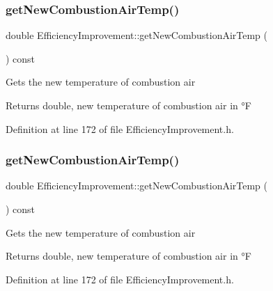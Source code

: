 \subsubsection{\texorpdfstring{get\+New\+Combustion\+Air\+Temp()}{getNewCombustionAirTemp()}\hspace{0.1cm}{\footnotesize\ttfamily [1/3]}}
{\footnotesize\ttfamily double Efficiency\+Improvement\+::get\+New\+Combustion\+Air\+Temp (\begin{DoxyParamCaption}{ }\end{DoxyParamCaption}) const\hspace{0.3cm}{\ttfamily [inline]}}

Gets the new temperature of combustion air

\begin{DoxyReturn}{Returns}
double, new temperature of combustion air in °F 
\end{DoxyReturn}


Definition at line 172 of file Efficiency\+Improvement.\+h.

\mbox{\label{class_efficiency_improvement_a6a699fe87fec378962c2ee1505600dce}} 
\subsubsection{\texorpdfstring{get\+New\+Combustion\+Air\+Temp()}{getNewCombustionAirTemp()}\hspace{0.1cm}{\footnotesize\ttfamily [2/3]}}
{\footnotesize\ttfamily double Efficiency\+Improvement\+::get\+New\+Combustion\+Air\+Temp (\begin{DoxyParamCaption}{ }\end{DoxyParamCaption}) const\hspace{0.3cm}{\ttfamily [inline]}}

Gets the new temperature of combustion air

\begin{DoxyReturn}{Returns}
double, new temperature of combustion air in °F 
\end{DoxyReturn}


Definition at line 172 of file Efficiency\+Improvement.\+h.

\mbox{\label{class_efficiency_improvement_a6a699fe87fec378962c2ee1505600dce}} 
